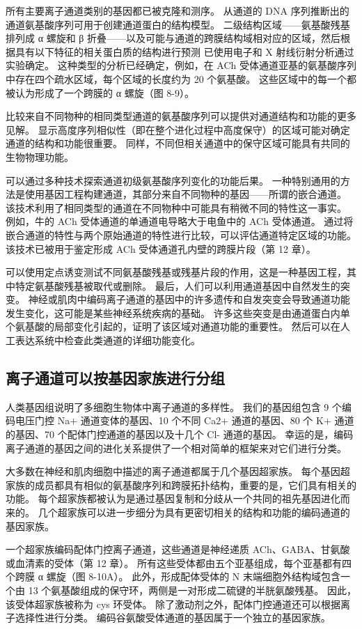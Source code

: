 所有主要离子通道类别的基因都已被克隆和测序。 从通道的 DNA 序列推断出的通道氨基酸序列可用于创建通道蛋白的结构模型。 二级结构区域——氨基酸残基排列成 α 螺旋和 β 折叠——以及可能与通道的跨膜结构域相对应的区域，然后根据具有以下特征的相关蛋白质的结构进行预测 已使用电子和 X 射线衍射分析通过实验确定。 这种类型的分析已经确定，例如，在 ACh 受体通道亚基的氨基酸序列中存在四个疏水区域，每个区域的长度约为 20 个氨基酸。 这些区域中的每一个都被认为形成了一个跨膜的 α 螺旋（图 8-9）。

比较来自不同物种的相同类型通道的氨基酸序列可以提供对通道结构和功能的更多见解。 显示高度序列相似性（即在整个进化过程中高度保守）的区域可能对确定通道的结构和功能很重要。 同样，不同但相关通道中的保守区域可能具有共同的生物物理功能。

可以通过多种技术探索通道初级氨基酸序列变化的功能后果。 一种特别通用的方法是使用基因工程构建通道，其部分来自不同物种的基因——所谓的嵌合通道。 该技术利用了相同类型的通道在不同物种中可能具有稍微不同的特性这一事实。 例如，牛的 ACh 受体通道的单通道电导略大于电鱼中的 ACh 受体通道。 通过将嵌合通道的特性与两个原始通道的特性进行比较，可以评估通道特定区域的功能。 该技术已被用于鉴定形成 ACh 受体通道孔内壁的跨膜片段（第 12 章）。

可以使用定点诱变测试不同氨基酸残基或残基片段的作用，这是一种基因工程，其中特定氨基酸残基被取代或删除。 最后，人们可以利用通道基因中自然发生的突变。 神经或肌肉中编码离子通道的基因中的许多遗传和自发突变会导致通道功能发生变化，这可能是某些神经系统疾病的基础。 许多这些突变是由通道蛋白内单个氨基酸的局部变化引起的，证明了该区域对通道功能的重要性。 然后可以在人工表达系统中检查此类通道的详细功能变化。


\subsection{离子通道可以按基因家族进行分组}
人类基因组说明了多细胞生物体中离子通道的多样性。 我们的基因组包含 9 个编码电压门控 Na+ 通道变体的基因、10 个不同 Ca2+ 通道的基因、80 个 K+ 通道的基因、70 个配体门控通道的基因以及十几个 Cl- 通道的基因。 幸运的是，编码离子通道的基因之间的进化关系提供了一个相对简单的框架来对它们进行分类。

大多数在神经和肌肉细胞中描述的离子通道都属于几个基因超家族。 每个基因超家族的成员都具有相似的氨基酸序列和跨膜拓扑结构，重要的是，它们具有相关的功能。 每个超家族都被认为是通过基因复制和分歧从一个共同的祖先基因进化而来的。 几个超家族可以进一步细分为具有更密切相关的结构和功能的编码通道的基因家族。

一个超家族编码配体门控离子通道，这些通道是神经递质 ACh、GABA、甘氨酸或血清素的受体（第 12 章）。 所有这些受体都由五个亚基组成，每个亚基都有四个跨膜 α 螺旋（图 8-10A）。 此外，形成配体受体的 N 末端细胞外结构域包含一个由 13 个氨基酸组成的保守环，两侧是一对形成二硫键的半胱氨酸残基。 因此，该受体超家族被称为 cys 环受体。 除了激动剂之外，配体门控通道还可以根据离子选择性进行分类。 编码谷氨酸受体通道的基因属于一个独立的基因家族。

